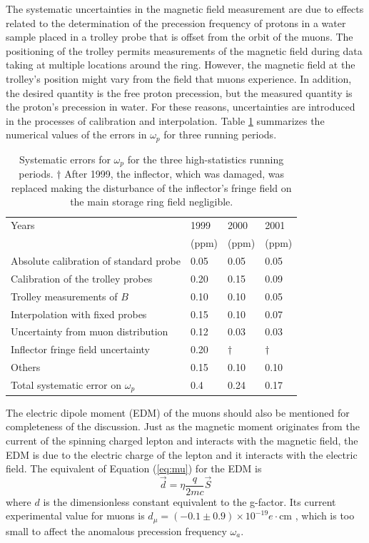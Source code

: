 \documentclass{outhesis}
\begin{document}
The systematic uncertainties in the magnetic field measurement are due to effects related to the determination of the precession frequency of protons in a water sample placed in a trolley probe that is offset from the orbit of the muons. The positioning of the trolley permits measurements of the magnetic field during data taking at multiple locations around the ring. However, the magnetic field at the trolley's position might vary from the field that muons experience. In addition, the desired quantity is the free proton precession, but the measured quantity is the proton's precession in water. For these reasons, uncertainties are introduced in the processes of calibration and interpolation. Table \ref{tab:wp} summarizes the numerical values of the errors in $\omega_p$ for three running periods.
\begin{table}
  \caption[Systematic errors for $\omega_p$]{Systematic errors for $\omega_p$ for the three high-statistics running periods. $\dagger$ After 1999, the inflector, which was damaged, was replaced making the disturbance of the inflector's fringe field on the main storage ring field negligible.}
  \label{tab:wp}
  \centering
  \begin{tabular}{*{4}{l}}
	\hline \hline
      Years   & 1999 & 2000  & 2001 \\ 
       & (ppm) & (ppm) & (ppm)\\
      \hline
       Absolute calibration of standard probe & 0.05 & 0.05 & 0.05  \\
       Calibration of the trolley probes & 0.20 & 0.15 & 0.09 \\
       Trolley measurements of $B$ & 0.10 & 0.10 & 0.05  \\
       Interpolation with fixed probes & 0.15 & 0.10 &  0.07 \\
       Uncertainty from muon distribution & 0.12 & 0.03 & 0.03 \\
       Inflector fringe field uncertainty & 0.20 & $\dagger$ &  $\dagger$  \\
       Others  & 0.15 & 0.10 & 0.10     \\ \hline
       Total systematic error on $\omega_p$ & 0.4 & 0.24 & 0.17 \\ \hline  \hline
     \end{tabular}
\end{table}

The electric dipole moment (EDM) of the muons should also be mentioned for completeness of the discussion. Just as the magnetic moment originates from the current of the spinning charged lepton and interacts with the magnetic field, the EDM is due to the electric charge of the lepton and it interacts with the electric field. The equivalent of Equation (\ref{eq:mu}) for the EDM is  
\begin{equation}
\overrightarrow{d} = \eta\frac{q}{2mc}\overrightarrow{S}
\label{eq:d}
\end{equation}
where $d$ is the dimensionless constant equivalent to the g-factor. Its current experimental value for muons is $d_\mu = \left(-0.1 \pm 0.9\right) \times 10^{-19} e \cdot \text{cm}$ \cite{pdg}, which is too small to affect the anomalous precession frequency $\omega_a$.
\end{document}
